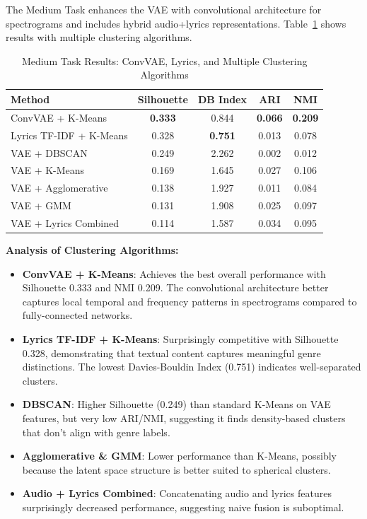 \documentclass{article}
\begin{document}
The Medium Task enhances the VAE with convolutional architecture for spectrograms and includes hybrid audio+lyrics representations. Table~\ref{tab:medium} shows results with multiple clustering algorithms.

\begin{table}[h]
\caption{Medium Task Results: ConvVAE, Lyrics, and Multiple Clustering Algorithms}
\label{tab:medium}
\centering
\begin{tabular}{lcccc}
\toprule
Method & Silhouette & DB Index & ARI & NMI \\
\midrule
ConvVAE + K-Means & \textbf{0.333} & 0.844 & \textbf{0.066} & \textbf{0.209} \\
Lyrics TF-IDF + K-Means & 0.328 & \textbf{0.751} & 0.013 & 0.078 \\
VAE + DBSCAN & 0.249 & 2.262 & 0.002 & 0.012 \\
VAE + K-Means & 0.169 & 1.645 & 0.027 & 0.106 \\
VAE + Agglomerative & 0.138 & 1.927 & 0.011 & 0.084 \\
VAE + GMM & 0.131 & 1.908 & 0.025 & 0.097 \\
VAE + Lyrics Combined & 0.114 & 1.587 & 0.034 & 0.095 \\
\bottomrule
\end{tabular}
\end{table}

\textbf{Analysis of Clustering Algorithms:}
\begin{itemize}
    \item \textbf{ConvVAE + K-Means}: Achieves the best overall performance with Silhouette 0.333 and NMI 0.209. The convolutional architecture better captures local temporal and frequency patterns in spectrograms compared to fully-connected networks.
    
    \item \textbf{Lyrics TF-IDF + K-Means}: Surprisingly competitive with Silhouette 0.328, demonstrating that textual content captures meaningful genre distinctions. The lowest Davies-Bouldin Index (0.751) indicates well-separated clusters.
    
    \item \textbf{DBSCAN}: Higher Silhouette (0.249) than standard K-Means on VAE features, but very low ARI/NMI, suggesting it finds density-based clusters that don't align with genre labels.
    
    \item \textbf{Agglomerative \& GMM}: Lower performance than K-Means, possibly because the latent space structure is better suited to spherical clusters.
    
    \item \textbf{Audio + Lyrics Combined}: Concatenating audio and lyrics features surprisingly decreased performance, suggesting naive fusion is suboptimal.
\end{itemize}
\end{document}
